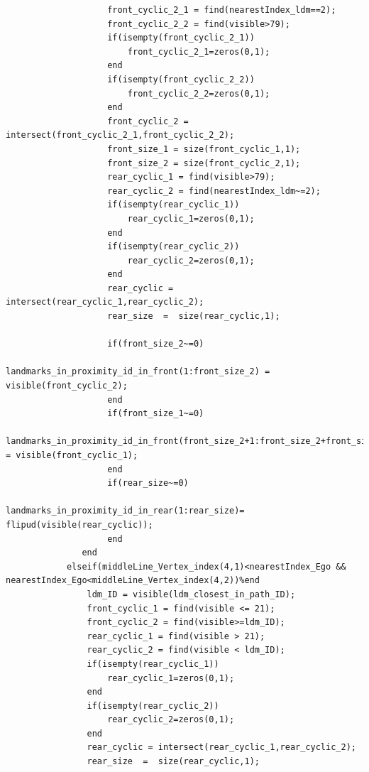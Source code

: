 \documentclass[12pt,a4paper]{article}
\begin{document}
{{{\begin{verbatim}
                    front_cyclic_2_1 = find(nearestIndex_ldm==2);
                    front_cyclic_2_2 = find(visible>79);
                    if(isempty(front_cyclic_2_1))
                        front_cyclic_2_1=zeros(0,1);
                    end
                    if(isempty(front_cyclic_2_2))
                        front_cyclic_2_2=zeros(0,1);
                    end              
                    front_cyclic_2 = intersect(front_cyclic_2_1,front_cyclic_2_2);
                    front_size_1 = size(front_cyclic_1,1);
                    front_size_2 = size(front_cyclic_2,1);
                    rear_cyclic_1 = find(visible>79);
                    rear_cyclic_2 = find(nearestIndex_ldm~=2);
                    if(isempty(rear_cyclic_1))
                        rear_cyclic_1=zeros(0,1);
                    end
                    if(isempty(rear_cyclic_2))
                        rear_cyclic_2=zeros(0,1);
                    end              
                    rear_cyclic = intersect(rear_cyclic_1,rear_cyclic_2);
                    rear_size  =  size(rear_cyclic,1);

                    if(front_size_2~=0)
                        landmarks_in_proximity_id_in_front(1:front_size_2) = visible(front_cyclic_2);
                    end
                    if(front_size_1~=0)
                        landmarks_in_proximity_id_in_front(front_size_2+1:front_size_2+front_size_1) = visible(front_cyclic_1);
                    end
                    if(rear_size~=0)
                        landmarks_in_proximity_id_in_rear(1:rear_size)= flipud(visible(rear_cyclic));
                    end
               end
            elseif(middleLine_Vertex_index(4,1)<nearestIndex_Ego && nearestIndex_Ego<middleLine_Vertex_index(4,2))%end
                ldm_ID = visible(ldm_closest_in_path_ID);
                front_cyclic_1 = find(visible <= 21);
                front_cyclic_2 = find(visible>=ldm_ID);
                rear_cyclic_1 = find(visible > 21);
                rear_cyclic_2 = find(visible < ldm_ID);
                if(isempty(rear_cyclic_1))
                    rear_cyclic_1=zeros(0,1);
                end
                if(isempty(rear_cyclic_2))
                    rear_cyclic_2=zeros(0,1);
                end                  
                rear_cyclic = intersect(rear_cyclic_1,rear_cyclic_2);
                rear_size  =  size(rear_cyclic,1);
              

\end{verbatim}}}}
\end{document}

